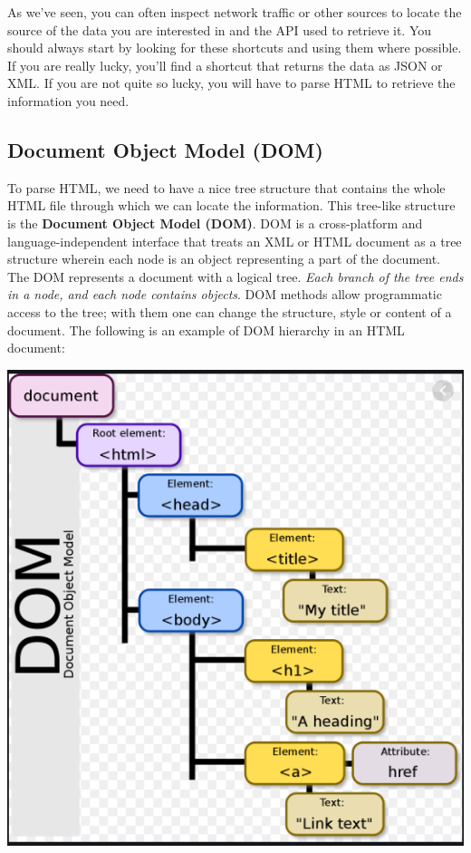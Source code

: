 \documentclass[
]{book}
\begin{document}
As we've seen, you can often inspect network traffic or other sources to locate the source of the data you are interested in and the API used to retrieve it. You should always start by looking for these shortcuts and using them where possible. If you are really lucky, you'll find a shortcut that returns the data as JSON or XML. If you are not quite so lucky, you will have to parse HTML to retrieve the information you need.

\hypertarget{document-object-model-dom}{%
\subsection{Document Object Model (DOM)}\label{document-object-model-dom}}

To parse HTML, we need to have a nice tree structure that contains the whole HTML file through which we can locate the information. This tree-like structure is the \textbf{Document Object Model (DOM)}. DOM is a cross-platform and language-independent interface that treats an XML or HTML document as a tree structure wherein each node is an object representing a part of the document. The DOM represents a document with a logical tree. \emph{Each branch of the tree ends in a node, and each node contains objects}. DOM methods allow programmatic access to the tree; with them one can change the structure, style or content of a document. The following is an example of DOM hierarchy in an HTML document:

\includegraphics{Python/PythonWebScrape/images/DOM.png}
\end{document}
